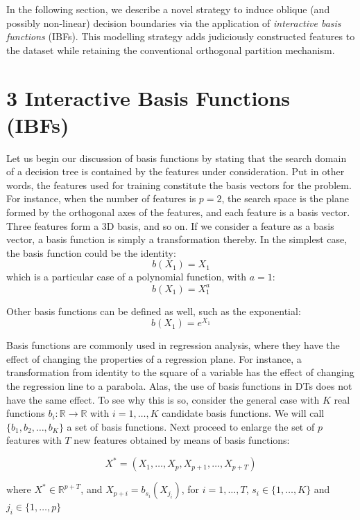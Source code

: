\documentclass[]{elsarticle} %
\begin{document}
In the following section, we describe a novel strategy to induce oblique
(and possibly non-linear) decision boundaries via the application of
\emph{interactive basis functions} (IBFs). This modelling strategy adds
judiciously constructed features to the dataset while retaining the
conventional orthogonal partition mechanism.

\section{3 Interactive Basis Functions
(IBFs)}\label{interactive-basis-functions-ibfs}

Let us begin our discussion of basis functions by stating that the
search domain of a decision tree is contained by the features under
consideration. Put in other words, the features used for training
constitute the basis vectors for the problem. For instance, when the
number of features is \(p=2\), the search space is the plane formed by
the orthogonal axes of the features, and each feature is a basis vector.
Three features form a 3D basis, and so on. If we consider a feature as a
basis vector, a basis function is simply a transformation thereby. In
the simplest case, the basis function could be the identity: \[
b(X_1) = X_1
\] which is a particular case of a polynomial function, with \(a=1\): \[
b(X_1) = X_1^a
\]

Other basis functions can be defined as well, such as the exponential:
\[
b(X_1) = e^{X_1}
\]

Basis functions are commonly used in regression analysis, where they
have the effect of changing the properties of a regression plane. For
instance, a transformation from identity to the square of a variable has
the effect of changing the regression line to a parabola. Alas, the use
of basis functions in DTs does not have the same effect. To see why this
is so, consider the general case with \(K\) real functions
\(b_{i}:\mathbb{R}\rightarrow\mathbb{R}\) with \(i=1,\dots,K\) candidate
basis functions. We will call \(\{b_1,b_2,\dots, b_K\}\) a set of basis
functions. Next proceed to enlarge the set of \(p\) features with \(T\)
new features obtained by means of basis functions:

\[
X^{\ast }=\left( X_{1},\dots,X_{p},X_{p+1},\dots ,X_{p+T} \right)
\]

where \(X^{\ast }\in \mathbb{R}^{p+T}\), and
\(X_{p+i}=b_{s_i}( X_{j_i})\), for \(i=1,\dots ,T\),
\(s_i\in \{1,\dots,K\}\) and \(j_i\in\{1,\dots,p\}\)
\end{document}
